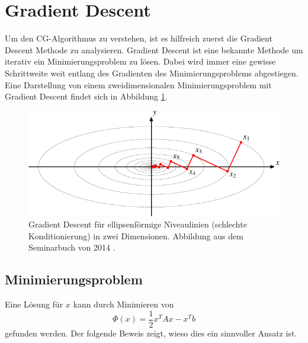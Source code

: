%
%
%
\section{Gradient Descent\label{cg:section:steepest_descent}}

%
Um den CG-Algorithmus zu verstehen, ist es hilfreich zuerst die Gradient Descent Methode zu analysieren.
Gradient Descent ist eine bekannte Methode um iterativ ein Minimierungsproblem zu lösen.
Dabei wird immer eine gewisse Schrittweite weit entlang des Gradienten des Minimierungsproblems abgestiegen.
Eine Darstellung von einem zweidimensionalen Minimierungsproblem mit Gradient Descent findet sich in Abbildung \ref{cg:abb:steepest_descent}.
%

\begin{figure}	
	\centering
	\includegraphics{papers/cg/images/descent-1}
	\caption{Gradient Descent für ellipsenförmige Niveaulinien (schlechte Konditionierung) in zwei Dimensionen. 
		Abbildung aus dem Seminarbuch von 2014 \cite{cg:book:hpc}.}
	\label{cg:abb:steepest_descent}
\end{figure}

\subsection{Minimierungsproblem \label{cg:subsection:Minimierungsproblem}}

Eine Lösung für $x$ kann durch Minimieren von
\begin{equation}
\Phi(x) = \frac{1}{2} x^T A x - x^T b
\end{equation}
gefunden werden.
Der folgende Beweis zeigt, wieso dies ein sinnvoller Ansatz ist.

